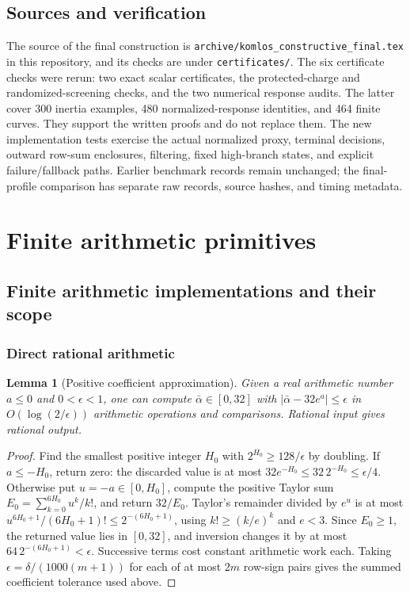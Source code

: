 \documentclass[11pt]{amsart}
\newtheorem{lemma}[theorem]{Lemma}
\theoremstyle{definition}\newtheorem{definition}[theorem]{Definition}
\theoremstyle{remark}\newtheorem{remark}[theorem]{Remark}
\numberwithin{equation}{section}
\begin{document}
\subsection{Sources and verification}
The source of the final construction is
\nolinkurl{archive/komlos_constructive_final.tex} in this repository,
and its checks are under \nolinkurl{certificates/}.
The six certificate checks were rerun: two exact scalar certificates,
the protected-charge and randomized-screening checks, and the two
numerical response audits. The latter cover 300 inertia examples,
480 normalized-response identities, and 464 finite curves.
They support the written proofs and do not replace them.
The new implementation tests exercise the actual normalized proxy,
terminal decisions, outward row-sum enclosures, filtering, fixed
high-branch states, and explicit failure/fallback paths. Earlier
benchmark records remain unchanged; the final-profile comparison has
separate raw records, source hashes, and timing metadata.

\appendix
\section{Finite arithmetic primitives}\label{app:arithmetic}


\subsection{Finite arithmetic implementations and their scope}\label{b:sec:implementation}
\subsubsection{Direct rational arithmetic}

\begin{lemma}[Positive coefficient approximation]\label{b:lem:scalar}
Given a real arithmetic number $a\le0$ and $0<\epsilon<1$, one can
compute $\bar\alpha\in[0,32]$ with
$|\bar\alpha-32e^a|\le\epsilon$ in $O(\log(2/\epsilon))$
arithmetic operations and comparisons. Rational input gives rational output.
\end{lemma}
\begin{proof}
Find the smallest positive integer $H_0$ with $2^{H_0}\ge128/\epsilon$
by doubling. If $a\le-H_0$, return zero: the discarded value is at most
$32e^{-H_0}\le32\,2^{-H_0}\le\epsilon/4$.
Otherwise put $u=-a\in[0,H_0]$, compute the positive Taylor sum
$E_0=\sum_{k=0}^{6H_0}u^k/k!$, and return $32/E_0$.
Taylor's remainder divided by $e^u$ is at most
$u^{6H_0+1}/(6H_0+1)!\le2^{-(6H_0+1)}$, using
$k!\ge(k/e)^k$ and $e<3$. Since $E_0\ge1$, the returned value lies in
$[0,32]$, and inversion changes it by at most
$64\,2^{-(6H_0+1)}<\epsilon$. Successive terms cost constant arithmetic
work each. Taking $\epsilon=\delta/(1000(m+1))$ for each of at most $2m$
row-sign pairs gives the summed coefficient tolerance used above.
\end{proof}
\end{document}
